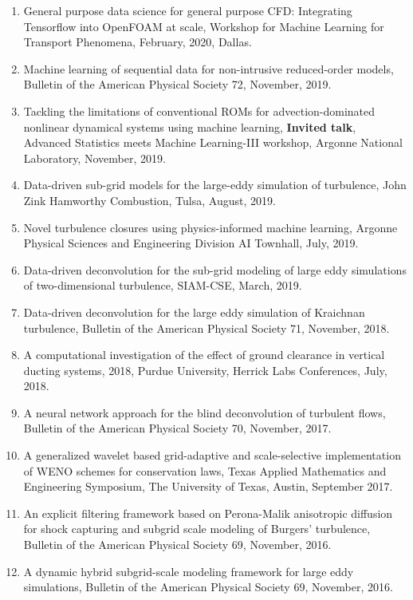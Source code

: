 \documentclass[letterpaper]{article}
\begin{document}
\begin{enumerate}
\item General purpose data science for general purpose CFD: Integrating Tensorflow into OpenFOAM at scale, Workshop for Machine Learning for Transport Phenomena, February, 2020, Dallas.

\item Machine learning of sequential data for non-intrusive reduced-order models, Bulletin of the American Physical Society 72, November, 2019.

\item Tackling the limitations of conventional ROMs for advection-dominated nonlinear dynamical systems using machine learning, \textbf{Invited talk}, Advanced Statistics meets Machine Learning-III workshop, Argonne National Laboratory, November, 2019.

\item Data-driven sub-grid models for the large-eddy simulation of turbulence, John Zink Hamworthy Combustion, Tulsa, August, 2019.

\item Novel turbulence closures using physics-informed machine learning, Argonne Physical Sciences and Engineering Division AI Townhall, July, 2019. 

\item Data-driven deconvolution for the sub-grid modeling of large eddy simulations of two-dimensional turbulence, SIAM-CSE, March, 2019.

\item Data-driven deconvolution for the large eddy simulation of Kraichnan turbulence, Bulletin of the American Physical Society 71, November, 2018.

\item A computational investigation of the effect of ground clearance in vertical ducting systems, 2018, Purdue University, Herrick Labs Conferences, July, 2018. 

\item A neural network approach for the blind deconvolution of turbulent flows, Bulletin of the American Physical Society 70, November, 2017.

\item A generalized wavelet based grid-adaptive and scale-selective implementation of WENO schemes for conservation laws, Texas Applied Mathematics and Engineering Symposium, The University of Texas, Austin, September 2017.

\item An explicit filtering framework based on Perona-Malik anisotropic diffusion for shock capturing and subgrid scale modeling of Burgers' turbulence, Bulletin of the American Physical Society 69, November, 2016.

\item A dynamic hybrid subgrid-scale modeling framework for large eddy simulations, Bulletin of the American Physical Society 69, November, 2016.

\end{enumerate}
\end{document}
